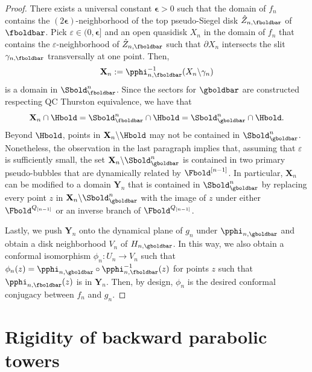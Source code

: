 \documentclass{amsart}
\begin{document}
\begin{proof}
    There exists a universal constant $\boldsymbol{\epsilon} > 0$ such that the domain of $f_n$ contains the $(2\boldsymbol{\epsilon})$-neighborhood of the top pseudo-Siegel disk $\hat{Z}_{n,\fboldbar}$ of $\fboldbar$.
    Pick $\varepsilon \in (0,\boldsymbol{\epsilon}]$ and an open quasidisk $X_n$ in the domain of $f_n$ that contains the $\varepsilon$-neighborhood of $\hat{Z}_{n,\fboldbar}$ such that $\partial X_n$ intersects the slit $\gamma_{n,\fboldbar}$ transversally at one point.
    Then,
    \[
        \mathbf{X}_n := \pphi_{n,\fboldbar}^{-1}(X_n \backslash \gamma_n)
    \]
    is a domain in $\Sbold_{\fboldbar}^n$.
    Since the sectors for $\gboldbar$ are constructed respecting QC Thurston equivalence, we have that 
    \[
        \mathbf{X}_n \cap \Hbold = \Sbold_{\fboldbar}^n \cap \Hbold = \Sbold_{\gboldbar}^n \cap \Hbold.
    \]
    Beyond $\Hbold$, points in $\mathbf{X}_n \backslash \Hbold$ may not be contained in $\Sbold_{\gboldbar}^n$.
    Nonetheless, the observation in the last paragraph implies that, assuming that $\varepsilon$ is sufficiently small, the set $\mathbf{X}_n \backslash \Sbold_{\gboldbar}^n$ is contained in two primary pseudo-bubbles that are dynamically related by $\Fbold^{[n-1]}$.
    In particular, $\mathbf{X}_n$ can be modified to a domain $\mathbf{Y}_n$ that is contained in $\Sbold_{\gboldbar}^n$ by replacing every point $z$ in $\mathbf{X}_n \backslash \Sbold_{\gboldbar}^n$ with the image of $z$ under either $\Fbold^{Q_{[n-1]}}$ or an inverse branch of $\Fbold^{Q_{[n-1]}}$.
    
    Lastly, we push $\mathbf{Y}_n$ onto the dynamical plane of $g_n$ under $\pphi_{n,\gboldbar}$ and obtain a disk neighborhood $V_n$ of $H_{n,\gboldbar}$.
    In this way, we also obtain a conformal isomorphism $\phi_n : U_n \to V_n$ such that $\phi_n(z) = \pphi_{n,\gboldbar} \circ \pphi_{n,\fboldbar}^{-1}(z)$ for points $z$ such that $\pphi_{n,\fboldbar}(z)$ is in $\mathbf{Y}_n$.
    Then, by design, $\phi_n$ is the desired conformal conjugacy between $f_n$ and $g_n$.
\end{proof}

\section{Rigidity of backward parabolic towers}
\label{sec:backward-rigidity}
\end{document}
